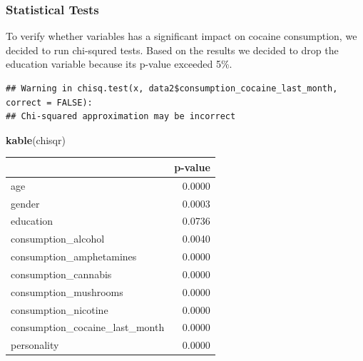\documentclass[
]{article}
\newenvironment{Shaded}{\begin{snugshade}}{\end{snugshade}}
\newcommand{\ControlFlowTok}[1]{\textcolor[rgb]{0.13,0.29,0.53}{\textbf{#1}}}
\newcommand{\DataTypeTok}[1]{\textcolor[rgb]{0.13,0.29,0.53}{#1}}
\newcommand{\DecValTok}[1]{\textcolor[rgb]{0.00,0.00,0.81}{#1}}
\newcommand{\KeywordTok}[1]{\textcolor[rgb]{0.13,0.29,0.53}{\textbf{#1}}}
\newcommand{\NormalTok}[1]{#1}
\newcommand{\OperatorTok}[1]{\textcolor[rgb]{0.81,0.36,0.00}{\textbf{#1}}}
\newcommand{\OtherTok}[1]{\textcolor[rgb]{0.56,0.35,0.01}{#1}}
\newcommand{\StringTok}[1]{\textcolor[rgb]{0.31,0.60,0.02}{#1}}
\begin{document}
\hypertarget{statistical-tests}{%
\subsubsection{Statistical Tests}\label{statistical-tests}}

To verify whether variables has a significant impact on cocaine
consumption, we decided to run chi-squred tests. Based on the results we
decided to drop the education variable because its p-value exceeded 5\%.

\begin{Shaded}
\end{Shaded}

\begin{verbatim}
## Warning in chisq.test(x, data2$consumption_cocaine_last_month, correct = FALSE):
## Chi-squared approximation may be incorrect
\end{verbatim}

\begin{Shaded}
\begin{Highlighting}[]
\KeywordTok{kable}\NormalTok{(chisqr)}
\end{Highlighting}
\end{Shaded}

\begin{longtable}[]{@{}lr@{}}
\toprule
& p-value\tabularnewline
\midrule
\endhead
age & 0.0000\tabularnewline
gender & 0.0003\tabularnewline
education & 0.0736\tabularnewline
consumption\_alcohol & 0.0040\tabularnewline
consumption\_amphetamines & 0.0000\tabularnewline
consumption\_cannabis & 0.0000\tabularnewline
consumption\_mushrooms & 0.0000\tabularnewline
consumption\_nicotine & 0.0000\tabularnewline
consumption\_cocaine\_last\_month & 0.0000\tabularnewline
personality & 0.0000\tabularnewline
\bottomrule
\end{longtable}
\end{document}
